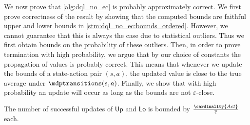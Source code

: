 \documentclass{theoretics}
\newcommand{\Actions}{Act}
\newcommand{\upperbound}{\mathsf{Up}}
\newcommand{\lowerbound}{\mathsf{Lo}}
\newcommand{\updatestep}{{\overline{\varepsilon}}}
\begin{document}
We now prove that \cref{alg:dql_no_ec} is probably approximately correct.
We first prove correctness of the result by showing that the computed bounds are faithful upper and lower bounds in \cref{stm:dql_no_ec:bounds_ordered}.
However, we cannot guarantee that this is always the case due to statistical outliers.
Thus we first obtain bounds on the probability of these outliers.
Then, in order to prove termination with high probability, we argue that by our choice of constants the propagation of values is probably correct.
This means that whenever we update the bounds of a state-action pair $(s, a)$, the updated value is close to the true average under $\mdptransitions(s, a)$.
Finally, we show that with high probability an update will occur as long as the bounds are not $\varepsilon$-close.


\begin{lemma} \label{stm:dql_no_ec:successful_update_count}
	The number of successful updates of $\upperbound$ and $\lowerbound$ is bounded by $\frac{\cardinality{\Actions}}{\updatestep}$ each.
\end{lemma}
\end{document}
